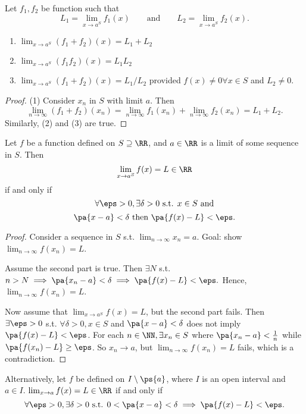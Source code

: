 \documentclass[11pt]{scrartcl}
\numberwithin{equation}{section}
\begin{document}
\begin{proposition}
    Let $f_1,f_2$ be function such that 
    \[L_1=\lim_{x\rightarrow a^S}f_1(x) \qquad\text{and}\qquad  
    L_2=\lim_{x\rightarrow a^S}f_2(x).\]
    \begin{enumerate}
        \item $\lim_{x\rightarrow a^S}(f_1+f_2)(x) = L_1+L_2$
        \item $\lim_{x\rightarrow a^S}(f_1f_2)(x) = L_1L_2$
        \item $\lim_{x\rightarrow a^S}(f_1+f_2)(x) = L_1/L_2$ provided 
        $f(x)\neq0 \forall x\in S$ and $L_2\neq 0$.
    \end{enumerate}
\end{proposition}

\begin{proof}
    (1) Consider $x_n$ in $S$ with limit $a$. 
    Then 
    \[
        \lim_{n\rightarrow \infty}(f_1+f_2)(x_n)=\lim_{n\rightarrow \infty}f_1(x_n)+\lim_{n\rightarrow \infty}f_2(x_n)=L_1+L_2.
    \]
    Similarly, (2) and (3) are true.
\end{proof}

\begin{theorem}
    Let $f$ be a function defined on $S\supseteq\RR$, and $a\in\RR$
    is a limit of some sequence in $S$. Then 
    \[ \lim_{x\rightarrow a^S}f(x)=L\in \RR\]
    if and only if 
    \[\forall \eps>0, \exists\delta>0 \text{ s.t. } x\in S\text{ and} \]
    \[\pa{x-a}<\delta \text{ then } \pa{f(x)-L}<\eps. \]
\end{theorem}

\begin{proof}
    Consider a sequence in $S$ s.t. $\lim_{n\rightarrow \infty}x_n=a$.
    Goal: show $\lim_{n\rightarrow \infty}f(x_n)=L$.

    Assume the second part is true. Then $\exists N$ s.t. 
    $n>N\implies \pa{x_n-a}<\delta\implies\pa{f(x)-L}<\eps.$
    Hence, $\lim_{n\rightarrow \infty}f(x_n)=L$.

    Now assume that $\lim_{x\rightarrow a^S}f(x)=L$, but the second part 
    fails. Then $\exists \eps>0$ s.t. $\forall\delta>0,x\in S$ and 
    $\pa{x-a}<\delta$ does not imply $\pa{f(x)-L}<\eps$.
    For each $n\in\NN, \exists x_n\in S$ where $\pa{x_n-a}<\frac{1}{n}$
    while $\pa{f(x_n)-L}\geq\eps$. So $x_n\to a$, but 
    $\lim_{n\rightarrow \infty}f(x_n)=L$ fails, which is a contradiction.
\end{proof}
Alternatively,
let $f$ be defined on $I\setminus\ps{a}$, where $I$ is an open interval 
and $a\in I$. $\lim_{x\rightarrow a}f(x)=L\in\RR$ if and only if 
\[\forall \eps>0, \exists\delta>0 \text{ s.t. } 0<\pa{x-a}<\delta 
\implies \pa{f(x)-L}<\eps. \]
\end{document}
